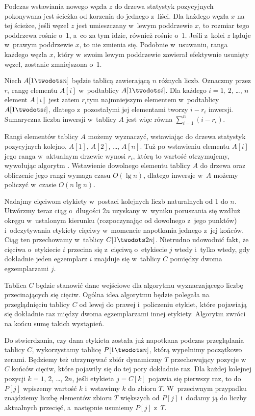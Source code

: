 Podczas wstawiania nowego węzła $z$ do drzewa statystyk pozycyjnych pokonywana jest ścieżka od korzenia do jednego z~liści.
Dla każdego węzła $x$ na tej ścieżce, jeśli węzeł $z$ jest umieszczany w~lewym poddrzewie $x$, to rozmiar tego poddrzewa rośnie o~1, a~co za tym idzie, również  rośnie o~1.
Jeśli z~kolei $z$ ląduje w~prawym poddrzewie $x$, to  nie zmienia się.
Podobnie w~usuwaniu, ranga każdego węzła $x$, który w~swoim lewym poddrzewie zawierał efektywnie usunięty węzeł, zostanie zmniejszona o~1.

\exercise %
Niech $A[1\twodots n]$ będzie tablicą zawierającą $n$ różnych liczb.
Oznaczmy przez $r_i$ rangę elementu $A[i]$ w~podtablicy $A[1\twodots i]$.
Dla każdego $i=1$, 2, \dots, $n$ element $A[i]$ jest zatem $r_i$\nbhyphen tym najmniejszym elementem w~podtablicy $A[1\twodots i]$, dlatego z~pozostałymi jej elementami tworzy $i-r_i$ inwersji.
Sumaryczna liczba inwersji w~tablicy $A$ jest więc równa $\sum_{i=1}^n(i-r_i)$.

Rangi elementów tablicy $A$ możemy wyznaczyć, wstawiając do drzewa statystyk pozycyjnych kolejno, $A[1]$, $A[2]$, \dots, $A[n]$.
Tuż po wstawieniu elementu $A[i]$ jego ranga w~aktualnym drzewie wynosi $r_i$, którą to wartość otrzymujemy, wywołując algorytm .
Wstawienie dowolnego elementu tablicy $A$ do drzewa oraz obliczenie jego rangi wymaga czasu $O(\lg n)$, dlatego inwersje w~$A$ możemy policzyć w~czasie $O(n\lg n)$.

\exercise %
Nadajmy cięciwom etykiety w~postaci kolejnych liczb naturalnych od 1 do $n$.
Utwórzmy teraz ciąg o~długości $2n$ uzyskany w~wyniku poruszania się wzdłuż okręgu w~ustalonym kierunku (rozpoczynając od dowolnego z~jego punktów) i~odczytywania etykiety cięciwy w~momencie napotkania jednego z~jej końców.
Ciąg ten przechowamy w~tablicy $C[1\twodots2n]$.
Nietrudno udowodnić fakt, że cięciwa o~etykiecie $i$ przecina się z~cięciwą o~etykiecie $j$ wtedy i~tylko wtedy, gdy dokładnie jeden egzemplarz $i$ znajduje się w~tablicy $C$ pomiędzy dwoma egzemplarzami $j$.

Tablica $C$ będzie stanowić dane wejściowe dla algorytmu  wyznaczającego liczbę przecinających się cięciw.
Ogólna idea algorytmu będzie polegała na przeglądnięciu tablicy $C$ od lewej do prawej i~policzeniu etykiet, które pojawiają się dokładnie raz między dwoma egzemplarzami innej etykiety.
Algorytm zwróci na końcu sumę takich wystąpień.

Do stwierdzania, czy dana etykieta została już napotkana podczas przeglądania tablicy $C$, wykorzystamy tablicę $P[1\twodots n]$, którą wypełnimy początkowo zerami.
Będziemy też utrzymywać zbiór dynamiczny $T$ przechowujący pozycje w~$C$ końców cięciw, które pojawiły się do tej pory dokładnie raz.
Dla każdej kolejnej pozycji $k=1$, 2, \dots, $2n$, jeśli etykieta $j=C[k]$ pojawia się pierwszy raz, to do $P[j]$ wpiszemy wartość $k$ i~wstawimy $k$ do zbioru $T$.
W~przeciwnym przypadku znajdziemy liczbę elementów zbioru $T$ większych od $P[j]$ i~dodamy ją do liczby aktualnych przecięć, a~następnie usuniemy $P[j]$ z~$T$.

